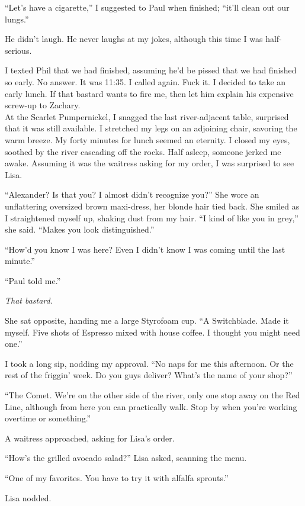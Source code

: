 ``Let's have a cigarette,'' I suggested to Paul when finished; ``it'll
clean out our lungs.''

He didn't laugh. He never laughs at my jokes, although this time I was
half-serious.

I texted Phil that we had finished, assuming he'd be pissed that we had
finished so early. No answer. It was 11:35. I called again. Fuck it. I
decided to take an early lunch. If that bastard wants to fire me, then
let him explain his expensive screw-up to Zachary.\\

At the Scarlet Pumpernickel, I snagged the last river-adjacent table,
surprised that it was still available. I stretched my legs on an
adjoining chair, savoring the warm breeze. My forty minutes for lunch
seemed an eternity. I closed my eyes, soothed by the river cascading off
the rocks. Half asleep, someone jerked me awake. Assuming it was the
waitress asking for my order, I was surprised to see Lisa.

``Alexander? Is that you? I almost didn't recognize you?'' She wore an
unflattering oversized brown maxi-dress, her blonde hair tied back. She
smiled as I straightened myself up, shaking dust from my hair. ``I kind
of like you in grey,'' she said. ``Makes you look distinguished.''

``How'd you know I was here? Even I didn't know I was coming until the
last minute.''

``Paul told me.''

\emph{That bastard.}

She sat opposite, handing me a large Styrofoam cup. ``A Switchblade.
Made it myself. Five shots of Espresso mixed with house coffee. I
thought you might need one.''

I took a long sip, nodding my approval. ``No naps for me this afternoon.
Or the rest of the friggin' week. Do you guys deliver? What's the name
of your shop?''

``The Comet. We're on the other side of the river, only one stop away on
the Red Line, although from here you can practically walk. Stop by when
you're working overtime or something.''

A waitress approached, asking for Lisa's order.

``How's the grilled avocado salad?'' Lisa asked, scanning the menu.

``One of my favorites. You have to try it with alfalfa sprouts.''

Lisa nodded.


